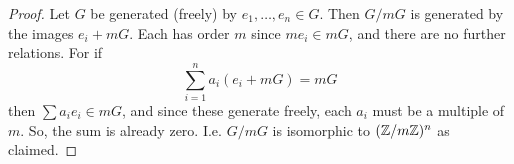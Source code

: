 \begin{proof}
	Let $G$ be generated (freely) by $e_1,\ldots,e_n \in G$. Then $G/mG$ is generated by the images $e_i + mG$. Each has order $m$ since $me_i \in mG$, and there are no further relations. For if
	\[ \sum_{i=1}^n a_i(e_i+mG) = mG \]
	then $\sum a_ie_i \in mG$, and since these generate freely, each $a_i$ must be a multiple of $m$. So, the sum is already zero. I.e. $G/mG$ is isomorphic to $(\mathbb{Z}/m\mathbb{Z})^n$ as claimed.
\end{proof}
